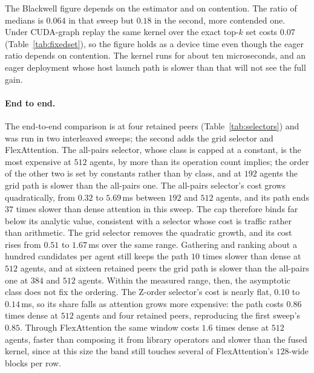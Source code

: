 The Blackwell figure depends on the estimator and on contention. The ratio of medians is $0.064$ in that sweep but $0.18$ in the second, more
contended one. Under CUDA-graph replay the same kernel over the exact top-$k$ set costs $0.07$
(Table~\ref{tab:fixedset}), so the figure holds as a device time even though
the eager ratio depends on contention. The kernel
runs for about ten microseconds, and an eager deployment whose host launch path
is slower than that will not see the full gain.

\paragraph{End to end.} The end-to-end comparison is at four retained peers
(Table~\ref{tab:selectors}) and was run in two interleaved sweeps; the second
adds the grid selector and FlexAttention. The all-pairs selector, whose class is capped at a
constant, is the most expensive at $512$ agents, by more than its operation
count implies; the order of the other two is set by constants rather than by
class, and at $192$ agents the grid path is slower than the all-pairs one. The all-pairs selector's cost grows quadratically, from $0.32$ to
$5.69$\,ms between $192$ and $512$ agents, and its path ends $37$ times slower
than dense attention in this sweep. The cap therefore binds far below its
analytic value, consistent with a selector whose cost is traffic rather than
arithmetic. The grid selector removes the quadratic growth, and its cost rises
from $0.51$ to $1.67$\,ms over the same range. Gathering and ranking about a
hundred candidates per agent still keeps the path $10$ times slower than dense
at $512$ agents, and at sixteen retained peers the grid path is slower than the
all-pairs one at $384$ and $512$ agents. Within the measured range, then, the
asymptotic class does not fix the ordering. The Z-order selector's cost is
nearly flat, $0.10$ to $0.14$\,ms, so its share falls as attention grows more
expensive: the path costs $0.86$ times dense at $512$ agents and four retained peers, reproducing the first sweep's $0.85$. Through
FlexAttention the same window costs $1.6$ times dense at $512$ agents, faster
than composing it from library operators and slower than the fused kernel,
since at this size the band still touches several of FlexAttention's
$128$-wide blocks per row.

